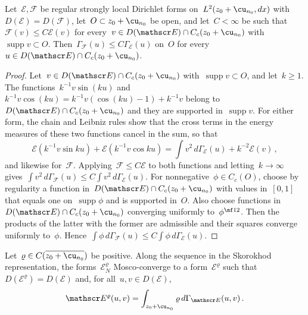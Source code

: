 \documentclass[11pt]{amsart}
\begin{document}
\begin{lemma}
\label{mfd:lem-sincos}
Let~$\mathscr E,\mathscr F$ be regular strongly local Dirichlet forms on~$L^2(z_0+\cu_{n_0},dx)$ with~$D(\mathscr E)=D(\mathscr F)$, let~$O\subset z_0+\cu_{n_0}$ be open, and let~$C<\infty$ be such that~$\mathscr F(v)\leq C\mathscr E(v)$ for every~$v\in D(\mathscr E)\cap C_c(z_0+\cu_{n_0})$ with~$\operatorname{supp}v\subset O$. Then~$\Gamma_{\mathscr F}(u)\leq C\Gamma_{\mathscr E}(u)$ on~$O$ for every~$u\in D(\mathscr E)\cap C_c(z_0+\cu_{n_0})$.
\end{lemma}

\begin{proof}
Let~$v\in D(\mathscr E)\cap C_c(z_0+\cu_{n_0})$ with~$\operatorname{supp}v\subset O$, and let~$k\geq1$. The functions~$k^{-1}v\sin(ku)$ and~$k^{-1}v\cos(ku)=k^{-1}v(\cos(ku)-1)+k^{-1}v$ belong to~$D(\mathscr E)\cap C_c(z_0+\cu_{n_0})$ and they are supported in~$\operatorname{supp}v$. For either form, the chain and Leibniz rules show that the cross terms in the energy measures of these two functions cancel in the sum, so that
\begin{equation*}
	\mathscr E(k^{-1}v\sin ku)+\mathscr E(k^{-1}v\cos ku)=\int v^2\,d\Gamma_{\mathscr E}(u)+k^{-2}\mathscr E(v)\,,
\end{equation*}
and likewise for~$\mathscr F$. Applying~$\mathscr F\leq C\mathscr E$ to both functions and letting~$k\to\infty$ gives~$\int v^2\,d\Gamma_{\mathscr F}(u)\leq C\int v^2\,d\Gamma_{\mathscr E}(u)$. For nonnegative~$\phi\in C_c(O)$, choose by regularity a function in~$D(\mathscr E)\cap C_c(z_0+\cu_{n_0})$ with values in~$[0,1]$ that equals one on~$\operatorname{supp}\phi$ and is supported in~$O$. Also choose functions in~$D(\mathscr E)\cap C_c(z_0+\cu_{n_0})$ converging uniformly to~$\phi^{\nf12}$. Then the products of the latter with the former are admissible and their squares converge uniformly to~$\phi$. Hence~$\int\phi\,d\Gamma_{\mathscr F}(u)\leq C\int\phi\,d\Gamma_{\mathscr E}(u)$.
\end{proof}

\begin{proposition}
\label{mfd:prop-21}
Let~$\varrho\in C(\overline{z_0+\cu_{n_0}})$ be positive. Along the sequence in the Skorokhod representation, the forms~$\mathscr E_N^\varrho$ Mosco-converge to a form~$\mathscr E^\varrho$ such that~$D(\mathscr E^\varrho)=D(\mathscr E)$ and, for all~$u,v\in D(\mathscr E)$,
\begin{equation}
	\mathscr E^{\varrho}(u,v)=\int_{z_0+\cu_{n_0}}\varrho\,d\Gamma_{\mathscr E}(u,v)\,.
	\label{eq:mfd-21}
\end{equation}
\end{proposition}
\end{document}
